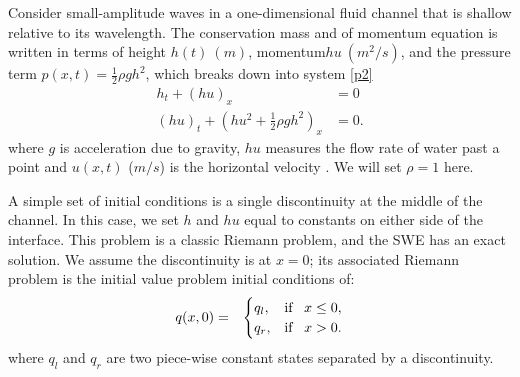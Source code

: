 \documentclass[10pt,a4paper]{article}
\begin{document}
	Consider small-amplitude waves in a one-dimensional fluid channel that is shallow relative to its wavelength. The conservation mass and of momentum equation is written in terms of  height $h(t)~(m)$, momentum$hu~(m^{2}/s)$, and  the pressure term $p(x,t) = \frac{1}{2}\rho gh^{2}$, which breaks down into system \eqref{p2}
	\begin{equation}
		\begin{aligned}
			h_{t} + (hu)_x &= 0 \\
			(hu)_t + \left(hu^{2} + \frac{1}{2}\rho gh^{2} \right)_x & = 0.
		\end{aligned}
		\label{p2}
	\end{equation}	
	where $g$ is acceleration due to gravity, $hu$ measures the flow rate of water past a point and $u(x,t)$ ($m/s$) is the horizontal velocity  \citep{leveque2002finite,toro2001shock}.  We will set $\rho = 1$ here.
	
	A simple set of initial conditions is a single discontinuity at the middle of the channel.  In this case, we set $h$ and $hu$ equal to constants on either side of the interface.  This problem is a classic Riemann problem, and the SWE has an exact solution.  We assume the discontinuity is at $x = 0$; its associated Riemann problem is the initial value problem initial conditions of:
	\begin{eqnarray}
		q(x,0)& =& \begin{cases}
			q_{l}, & \text{if \, $x \le 0,$}\\
			q_{r},& \text{if \, $x > 0$}.\\
			
		\end{cases}  
		\label{rp1}     
	\end{eqnarray}
	where $q_{l}$ and $q_{r}$ are two piece-wise constant states separated by a discontinuity. 
	
\end{document}
